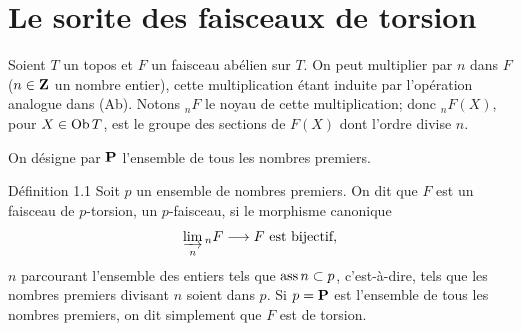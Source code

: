 \documentclass[10pt]{../fichiers-configuration-latex/smfart}
\begin{document}
\section{Le sorite des faisceaux de torsion}

Soient $T$ un topos et $F$ un faisceau abélien sur $T$. On peut
multiplier par $n$ dans $F$ ($n\in \mathbf{Z}$ un nombre
entier), cette multiplication étant induite par l'opération analogue
dans (Ab). Notons ${}_nF$ le noyau de cette multiplication; donc
${}_nF(X)$, pour $X\in \operatorname{Ob} T$, est le groupe des sections de $F(X)$
dont l'ordre divise $n$.

On désigne par $\mathbf{P}$ l'ensemble de tous les nombres
premiers.

\begin{enonce*}{Définition 1.1}
Soit $p$ un ensemble de nombres premiers. On dit que $F$ est un
faisceau de $p$-torsion,  un $p$-faisceau, si le morphisme canonique
$$
\varinjlim_n {}_nF\longrightarrow F\text{ est bijectif}{},
$$
$n$ parcourant l'ensemble des entiers tels que $\operatorname{ass} n\subset p$,
c'est-à-dire, tels que les nombres premiers divisant $n$ soient dans
$p$. Si $p=\mathbf{P}$ est l'ensemble de tous les nombres
premiers, on dit simplement que $F$ est de torsion.
\end{enonce*}
\end{document}
